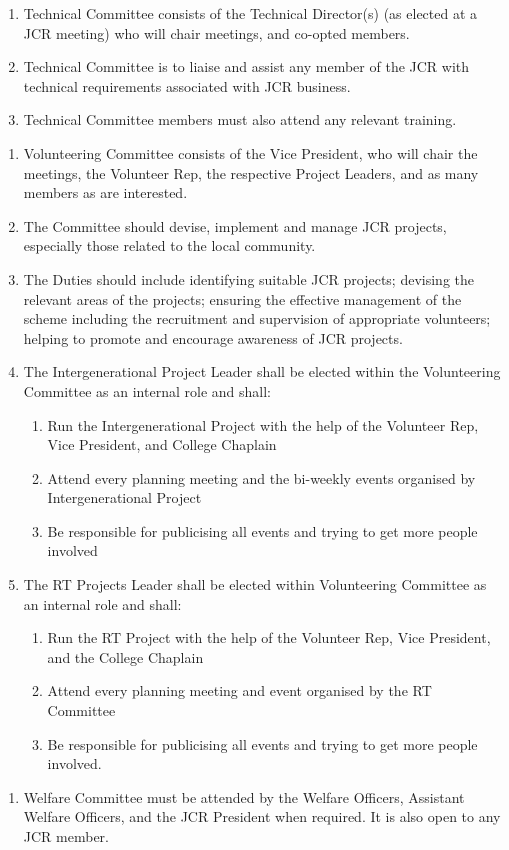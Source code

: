 
\begin{enumerate}
    \item Technical Committee consists of the Technical Director(s) (as elected at a JCR meeting) who will chair meetings, and co-opted members.
    \item Technical Committee is to liaise and assist any member of the JCR with technical requirements associated with JCR business.
    \item Technical Committee members must also attend any relevant training.
\end{enumerate}


\begin{enumerate}
    \item  Volunteering Committee consists of the Vice President, who will chair the meetings, the Volunteer Rep, the respective Project Leaders, and as many members as are interested.
    \item The Committee should devise, implement and manage JCR projects, especially those related to the local community.
    \item The Duties should include identifying suitable JCR projects; devising the relevant areas of the projects; ensuring the effective management of the scheme including the recruitment and supervision of appropriate volunteers; helping to promote and encourage awareness of JCR projects.
    \item The Intergenerational Project Leader shall be elected within the Volunteering Committee as an internal role and shall:
    \begin{enumerate}
        \item Run the Intergenerational Project with the help of the Volunteer Rep, Vice President, and College Chaplain
        \item Attend every planning meeting and the bi-weekly events organised by Intergenerational Project
        \item Be responsible for publicising all events and trying to get more people involved
    \end{enumerate}
    \item The RT Projects Leader shall be elected within Volunteering Committee as an internal role and shall:
    \begin{enumerate}
        \item Run the RT Project with the help of the Volunteer Rep, Vice President, and the College Chaplain
        \item Attend every planning meeting and event organised by the RT Committee 
        \item Be responsible for publicising all events and trying to get more people involved.
    \end{enumerate}
\end{enumerate}



\begin{enumerate}
    \item Welfare Committee must be attended by the Welfare Officers, Assistant Welfare Officers, and the JCR President when required. It is also open to any JCR member.
\end{enumerate}